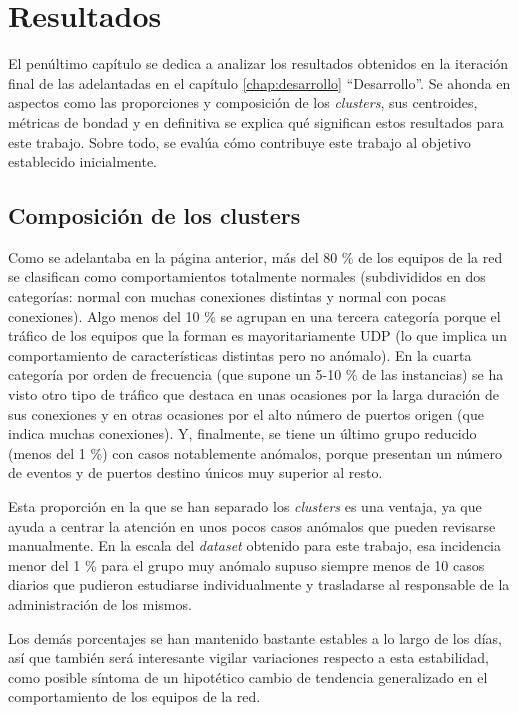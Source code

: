 \chapter{Resultados}\label{chap:resultados}

El penúltimo capítulo se dedica a analizar los resultados obtenidos en la iteración final de las adelantadas en el capítulo \ref{chap:desarrollo} ``Desarrollo''.
Se ahonda en aspectos como las proporciones y composición de los \emph{clusters}, sus centroides, métricas de bondad y en definitiva se explica qué significan estos resultados para este trabajo.
Sobre todo, se evalúa cómo contribuye este trabajo al objetivo establecido inicialmente.

\section{Composición de los clusters}\label{sec:composicionclusters}

Como se adelantaba en la página anterior, más del 80 \% de los equipos de la red se clasifican como comportamientos totalmente normales (subdivididos en dos categorías: normal con muchas conexiones distintas y normal con pocas conexiones).
Algo menos del 10 \% se agrupan en una tercera categoría porque el tráfico de los equipos que la forman es mayoritariamente UDP (lo que implica un comportamiento de características distintas pero no anómalo).
En la cuarta categoría por orden de frecuencia (que supone un 5-10 \% de las instancias) se ha visto otro tipo de tráfico que destaca en unas ocasiones por la larga duración de sus conexiones y en otras ocasiones por el alto número de puertos origen (que indica muchas conexiones).
Y, finalmente, se tiene un último grupo reducido (menos del 1 \%) con casos notablemente anómalos, porque presentan un número de eventos y de puertos destino únicos muy superior al resto.

Esta proporción en la que se han separado los \emph{clusters} es una ventaja, ya que ayuda a centrar la atención en unos pocos casos anómalos que pueden revisarse manualmente.
En la escala del \emph{dataset} obtenido para este trabajo, esa incidencia menor del 1 \% para el grupo muy anómalo supuso siempre menos de 10 casos diarios que pudieron estudiarse individualmente y trasladarse al responsable de la administración de los mismos.

Los demás porcentajes se han mantenido bastante estables a lo largo de los días, así que también será interesante vigilar variaciones respecto a esta estabilidad, como posible síntoma de un hipotético cambio de tendencia generalizado en el comportamiento de los equipos de la red.

